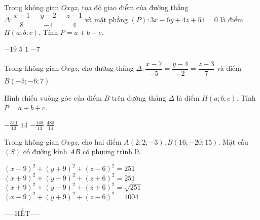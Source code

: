 \documentclass[12pt,a4paper]{article}
\begin{document}
\begin{ex}
 Trong không gian ${Oxyz}$, tọa độ giao điểm của đường thẳng ${\Delta}:\dfrac{x - 1}{8}=\dfrac{y - 2}{-1}=\dfrac{z - 1}{4}$ và mặt phẳng $(P):3 x - 6 y + 4 z + 51=0$ là điểm $H(a;b;c)$. Tính $P=a+b+c$.
 
\choice
{ ${-19}$ }
   { ${5}$ }
     { ${1}$ }
    { \True ${-7}$ }
\end{ex}

\begin{ex}
 Trong không gian ${Oxyz}$, cho đường thẳng ${\Delta}:\dfrac{x - 7}{-5}=\dfrac{y - 4}{-2}=\dfrac{z - 3}{7}$ và điểm $B(-5;-6;7)$.

 Hình chiếu vuông góc của điểm $B$ trên đường thẳng ${\Delta}$ là điểm $H(a;b;c)$. Tính $P=a+b+c$.
 
\choice
{ ${- \frac{311}{13}}$ }
   { \True ${14}$ }
     { ${- \frac{148}{13}}$ }
    { ${\frac{480}{13}}$ }
\end{ex}

\begin{ex}
 Trong không gian ${Oxyz}$, cho hai điểm $A(2;2;-3),B(16;-20;15)$. Mặt cầu ${(S)}$ có đường kính ${AB}$ có phương trình là
 
\choice
{ \True $\left(x - 9\right)^{2}+\left(y + 9\right)^{2}+\left(z - 6\right)^{2}=251$ }
   { $\left(x + 9\right)^{2}+\left(y - 9\right)^{2}+\left(z + 6\right)^{2}=251$ }
     { $\left(x + 9\right)^{2}+\left(y - 9\right)^{2}+\left(z + 6\right)^{2}=\sqrt{251}$ }
    { $\left(x - 9\right)^{2}+\left(y + 9\right)^{2}+\left(z - 6\right)^{2}=1004$ }
\end{ex}


 \begin{center}
-----HẾT-----
\end{center}

\end{document}

